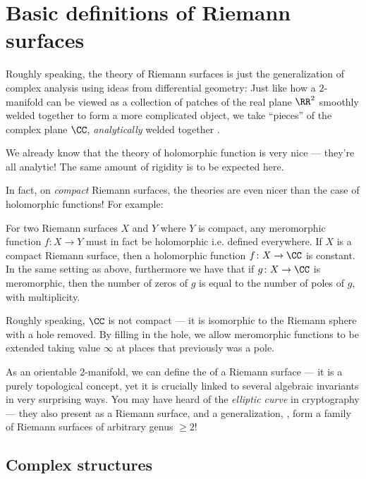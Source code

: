 \chapter{Basic definitions of Riemann surfaces}
\label{ch:complex_structure_def}

Roughly speaking, the theory of Riemann surfaces is just the generalization of complex analysis
using ideas from differential geometry:
Just like how a $2$-manifold can be viewed as a collection of patches of the real plane $\RR^2$
smoothly welded together to form a more complicated object,
we take ``pieces'' of the complex plane $\CC$, \emph{analytically} welded together .

We already know that the theory of holomorphic function is very nice --- they're all analytic!
The same amount of rigidity is to be expected here.

In fact, on \emph{compact} Riemann surfaces, the theories are even nicer than the case of
holomorphic functions! For example:
\begin{itemize}
	\ii For two Riemann surfaces $X$ and $Y$ where $Y$ is compact, any meromorphic function $f
	\colon X \to Y$ must in fact be holomorphic i.e. defined everywhere.
	\ii If $X$ is a compact Riemann surface, then a holomorphic function $f \colon X \to \CC$ is
	constant.
	\ii In the same setting as above, furthermore we have that if $g \colon X \to \CC$ is
	meromorphic, then the number of zeros of $g$ is equal to the number of poles of $g$, with
	multiplicity.
\end{itemize}

\begin{remark}
Roughly speaking, $\CC$ is not compact --- it is isomorphic to the Riemann sphere with a hole
removed. By filling in the hole, we allow meromorphic functions to be extended taking value $\infty$
at places that previously was a pole.
\end{remark}

As an orientable $2$-manifold, we can define the  of a Riemann surface --- it is a
purely topological concept, yet it is crucially linked to several algebraic invariants
in very surprising ways.
You may have heard of the \emph{elliptic curve} in cryptography --- they also present as a Riemann
surface, and a generalization, , form a family of Riemann surfaces of
arbitrary genus $\geq 2$!

\section{Complex structures}

